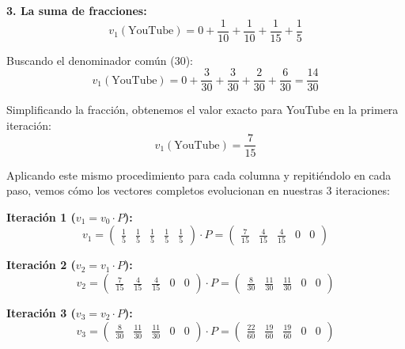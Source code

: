 \documentclass[12pt,letterpaper]{article}
\begin{document}
\textbf{3. La suma de fracciones:}
\begin{equation}
    v_1(\text{YouTube}) = 0 + \frac{1}{10} + \frac{1}{10} + \frac{1}{15} + \frac{1}{5}
\end{equation}

Buscando el denominador común (30):
\begin{equation}
    v_1(\text{YouTube}) = 0 + \frac{3}{30} + \frac{3}{30} + \frac{2}{30} + \frac{6}{30} = \frac{14}{30}
\end{equation}

Simplificando la fracción, obtenemos el valor exacto para YouTube en la primera iteración:
\begin{equation}
    v_1(\text{YouTube}) = \frac{7}{15}
\end{equation}

Aplicando este mismo procedimiento para cada columna y repitiéndolo en cada paso, vemos cómo los vectores completos evolucionan en nuestras 3 iteraciones:

\textbf{Iteración 1 ($v_1 = v_0 \cdot P$):}
\begin{equation*}
    v_1 = \begin{pmatrix} \frac{1}{5} & \frac{1}{5} & \frac{1}{5} & \frac{1}{5} & \frac{1}{5} \end{pmatrix} \cdot P = \begin{pmatrix} \frac{7}{15} & \frac{4}{15} & \frac{4}{15} & 0 & 0 \end{pmatrix}
\end{equation*}

\textbf{Iteración 2 ($v_2 = v_1 \cdot P$):}
\begin{equation*}
    v_2 = \begin{pmatrix} \frac{7}{15} & \frac{4}{15} & \frac{4}{15} & 0 & 0 \end{pmatrix} \cdot P = \begin{pmatrix} \frac{8}{30} & \frac{11}{30} & \frac{11}{30} & 0 & 0 \end{pmatrix}
\end{equation*}

\textbf{Iteración 3 ($v_3 = v_2 \cdot P$):}
\begin{equation*}
    v_3 = \begin{pmatrix} \frac{8}{30} & \frac{11}{30} & \frac{11}{30} & 0 & 0 \end{pmatrix} \cdot P = \begin{pmatrix} \frac{22}{60} & \frac{19}{60} & \frac{19}{60} & 0 & 0 \end{pmatrix}
\end{equation*}
\end{document}
